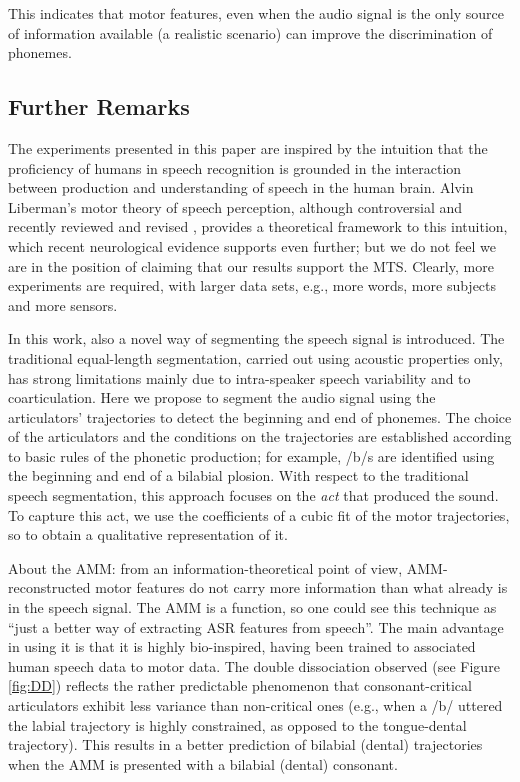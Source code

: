 \documentclass[10pt]{article}
\begin{document}
This indicates that motor features, even when the audio signal is the only source of
information available (a realistic scenario) can improve the discrimination of phonemes.

\subsection*{Further Remarks}

The experiments presented in this paper are inspired by the intuition that the
proficiency of humans in speech recognition is grounded in the interaction
between production and understanding of speech in the human brain. Alvin
Liberman's motor theory of speech perception, although controversial and
recently reviewed and revised \cite{liberman1,liberman2,galant,massaro},
provides a theoretical framework to this intuition, which recent neurological
evidence \cite{dausilio} supports even further; but we do not feel we are in
the position of claiming that our results support the MTS. Clearly, more
experiments are required, with larger data sets, e.g., more words, more subjects
and more sensors.

In this work, also a novel way of segmenting the speech signal is introduced.
The traditional equal-length segmentation, carried out using acoustic properties
only, has strong limitations mainly due to intra-speaker speech variability and
to coarticulation. Here we propose to segment the audio signal using the articulators'
trajectories to detect the beginning and end of phonemes. The choice of the articulators
and the conditions on the trajectories are established according to basic rules of
the phonetic production; for example, /b/s are identified using the beginning and end of
a bilabial plosion. With respect to the traditional speech segmentation, this approach
focuses on the \emph{act} that produced the sound. To capture this act, we use the
coefficients of a cubic fit of the motor trajectories, so to obtain a qualitative
representation of it.

About the AMM: from an information-theoretical point of view, AMM-reconstructed
motor features do not carry more information than what already is in the speech signal.
The AMM is a function, so one could see this technique as
``just a better way of extracting ASR features from speech''.
The main advantage in using it is that it is highly bio-inspired,
having been trained to associated human speech data to motor data. The double dissociation
observed (see Figure \ref{fig:DD}) reflects the rather predictable phenomenon
that consonant-critical articulators exhibit less variance than non-critical ones (e.g.,
when a /b/ uttered the labial trajectory is highly constrained, as opposed to the tongue-dental
trajectory). This results in a better prediction of bilabial (dental) trajectories when the
AMM is presented with a bilabial (dental) consonant.
\end{document}

